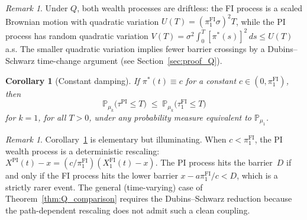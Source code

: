 \documentclass[12pt]{article}
\newtheorem{corollary}[theorem]{Corollary}
\theoremstyle{remark}
\newtheorem{remark}[theorem]{Remark}
\theoremstyle{definition}
\newcommand{\Prob}{\mathbb{P}}
\newcommand{\FI}{\mathrm{FI}}
\newcommand{\PI}{\mathrm{PI}}
\begin{document}
\begin{remark}\label{rem:Q_intuition}
Under $Q$, both wealth processes are driftless: the FI process is a
scaled Brownian motion with quadratic variation
$U(T) = (\pi_1^{\FI}\sigma)^2 T$, while the PI process has random
quadratic variation
$V(T) = \sigma^2\int_0^T [\pi^*(s)]^2\,ds \le U(T)$ a.s.
The smaller quadratic variation implies fewer barrier crossings by
a Dubins--Schwarz time-change argument (see Section~\ref{sec:proof_Q}).
\end{remark}

\begin{corollary}[Constant damping]
\label{cor:constant}
If $\pi^*(t) \equiv c$ for a constant $c \in (0, \pi_1^{\FI})$, then
\begin{equation}\label{eq:const_comp}
  \Prob_{\mu_k}\bigl(\tau^{\PI} \le T\bigr)
  \;\le\;
  \Prob_{\mu_k}\bigl(\tau_1^{\FI} \le T\bigr)
\end{equation}
for $k = 1$, for all $T > 0$, under \emph{any} probability measure
equivalent to $\Prob_{\mu_1}$.
\end{corollary}

\begin{remark}\label{rem:constant_intuition}
Corollary~\ref{cor:constant} is elementary but illuminating.
When $c < \pi_1^{\FI}$, the PI wealth process is a deterministic
rescaling: $X^{\PI}(t) - x = (c/\pi_1^{\FI})(X_1^{\FI}(t) - x)$.
The PI process hits the barrier~$D$ if and only if the FI process
hits the lower barrier
$x - a\pi_1^{\FI}/c < D$, which is a strictly rarer event.
The general (time-varying) case of Theorem~\ref{thm:Q_comparison}
requires the Dubins--Schwarz reduction because the path-dependent
rescaling does not admit such a clean coupling.
\end{remark}
\end{document}
